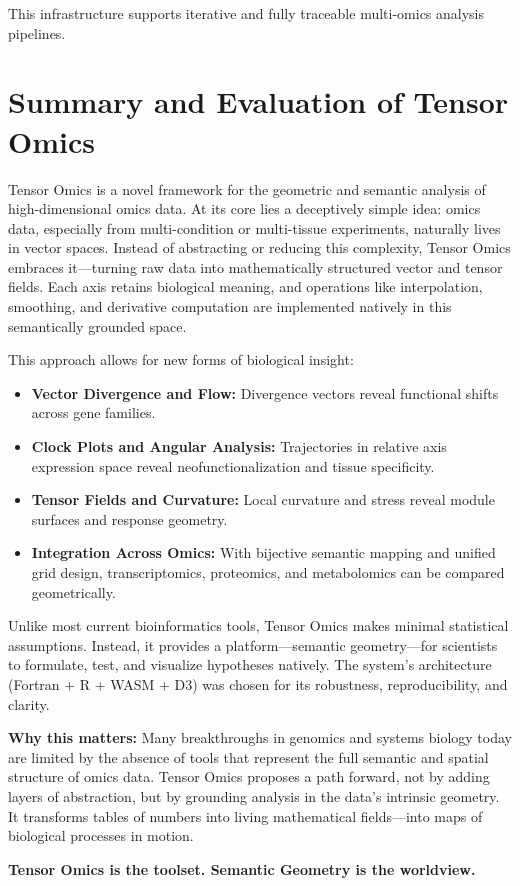 \documentclass[11pt]{article}
\begin{document}
This infrastructure supports iterative and fully traceable multi-omics analysis pipelines.

\section{Summary and Evaluation of Tensor Omics}

Tensor Omics is a novel framework for the geometric and semantic analysis of high-dimensional omics data. At its core lies a deceptively simple idea: omics data, especially from multi-condition or multi-tissue experiments, naturally lives in vector spaces. Instead of abstracting or reducing this complexity, Tensor Omics embraces it—turning raw data into mathematically structured vector and tensor fields. Each axis retains biological meaning, and operations like interpolation, smoothing, and derivative computation are implemented natively in this semantically grounded space.

This approach allows for new forms of biological insight:

\begin{itemize}[leftmargin=1.5em]
    \item \textbf{Vector Divergence and Flow:} Divergence vectors reveal functional shifts across gene families.
    \item \textbf{Clock Plots and Angular Analysis:} Trajectories in relative axis expression space reveal neofunctionalization and tissue specificity.
    \item \textbf{Tensor Fields and Curvature:} Local curvature and stress reveal module surfaces and response geometry.
    \item \textbf{Integration Across Omics:} With bijective semantic mapping and unified grid design, transcriptomics, proteomics, and metabolomics can be compared geometrically.
\end{itemize}

Unlike most current bioinformatics tools, Tensor Omics makes minimal statistical assumptions. Instead, it provides a platform—semantic geometry—for scientists to formulate, test, and visualize hypotheses natively. The system's architecture (Fortran + R + WASM + D3) was chosen for its robustness, reproducibility, and clarity.

\textbf{Why this matters:} Many breakthroughs in genomics and systems biology today are limited by the absence of tools that represent the full semantic and spatial structure of omics data. Tensor Omics proposes a path forward, not by adding layers of abstraction, but by grounding analysis in the data's intrinsic geometry. It transforms tables of numbers into living mathematical fields—into maps of biological processes in motion.

\textbf{Tensor Omics is the toolset. Semantic Geometry is the worldview.}
\end{document}
